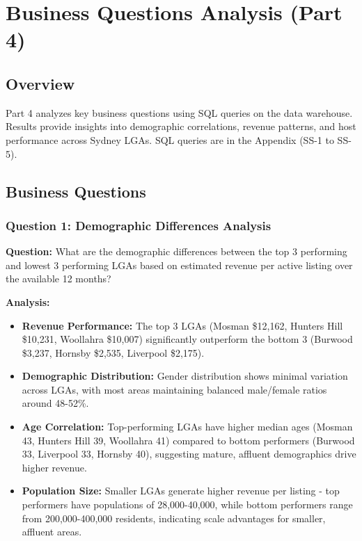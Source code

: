 \section{Business Questions Analysis (Part 4)}

\subsection{Overview}
Part 4 analyzes key business questions using SQL queries on the data warehouse. Results provide insights into demographic correlations, revenue patterns, and host performance across Sydney LGAs. SQL queries are in the Appendix (SS-1 to SS-5).

\subsection{Business Questions}

\subsubsection{Question 1: Demographic Differences Analysis}
\textbf{Question:} What are the demographic differences between the top 3 performing and lowest 3 performing LGAs based on estimated revenue per active listing over the available 12 months?

\textbf{Analysis:}
\begin{itemize}
\item \textbf{Revenue Performance:} The top 3 LGAs (Mosman \$12,162, Hunters Hill \$10,231, Woollahra \$10,007) significantly outperform the bottom 3 (Burwood \$3,237, Hornsby \$2,535, Liverpool \$2,175).
\item \textbf{Demographic Distribution:} Gender distribution shows minimal variation across LGAs, with most areas maintaining balanced male/female ratios around 48-52\%.
\item \textbf{Age Correlation:} Top-performing LGAs have higher median ages (Mosman 43, Hunters Hill 39, Woollahra 41) compared to bottom performers (Burwood 33, Liverpool 33, Hornsby 40), suggesting mature, affluent demographics drive higher revenue.
\item \textbf{Population Size:} Smaller LGAs generate higher revenue per listing - top performers have populations of 28,000-40,000, while bottom performers range from 200,000-400,000 residents, indicating scale advantages for smaller, affluent areas.
\end{itemize}

